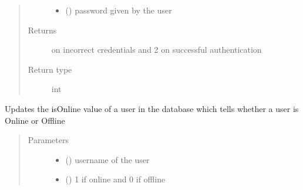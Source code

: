 \documentclass[letterpaper,10pt,english]{sphinxmanual}
\begin{document}
\begin{fulllineitems}
\begin{fulllineitems}
\begin{quote}
\begin{description}
\begin{itemize}
\item {} 
 () \textendash{} password given by the user

\end{itemize}

\item[{Returns}]  on incorrect credentials and 2 on successful authentication

\item[{Return type}] \leavevmode
int

\end{description}\end{quote}

\end{fulllineitems}


\begin{fulllineitems}
\label{\detokenize{sql:sql.Database.change_status}}
Updates the isOnline value of a user in the database which tells whether a user is Online or Offline
\begin{quote}\begin{description}
\item[{Parameters}] \leavevmode\begin{itemize}
\item {} 
 () \textendash{} username of the user

\item {} 
 () \textendash{} 1 if online and 0 if offline

\end{itemize}

\end{description}\end{quote}

\end{fulllineitems}



\end{fulllineitems}
\end{document}

